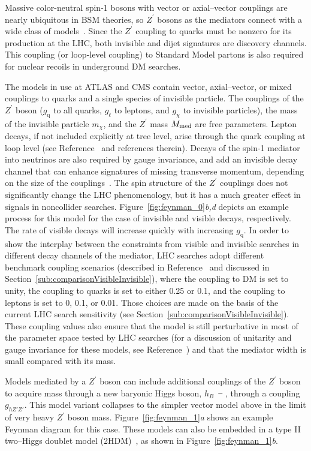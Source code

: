 \documentclass{ar-1col}
\newcommand{\chiDM}{\ensuremath{\chi}\xspace}
\newcommand{\IP}{invisible particle}
\newcommand{\mMed}{\ensuremath{M_{\rm{med}}}\xspace}
\newcommand{\mmed}{\mMed}
\newcommand{\gDM}{\ensuremath{g_{\chiDM}}\xspace}
\newcommand{\gl}{$g_{\ell}$\xspace}
\newcommand{\gq}{$g_{\mathrm{q}}$\xspace}
\newcommand{\mdm}{\ensuremath{m_{\chiDM}}\xspace}
\newcommand{\ghZprimeZprime}{\ensuremath{g_{hZ'Z'}}\xspace}
\newcommand{\Zprime}{\ensuremath{{Z}^\prime}\xspace}
\providecommand{\DIFadd}[1]{{\protect\color{blue}\uwave{#1}}} %
\providecommand{\DIFdel}[1]{{\protect\color{red}\sout{#1}}}                      %
\providecommand{\DIFaddbegin}{} %
\providecommand{\DIFaddend}{} %
\providecommand{\DIFdelbegin}{} %
\providecommand{\DIFdelend}{} %
\begin{document}
{{Massive color-neutral spin-1 bosons with vector or
axial--vector couplings} are nearly ubiquitous in BSM theories, so
\Zprime bosons as the mediators connect with a wide class of
models~\cite{Shoemaker:2011vi}. Since the \Zprime coupling to
quarks must be nonzero for its production at the LHC, both
invisible and dijet signatures are discovery channels. This
coupling (or loop-level coupling) to Standard Model partons is also required
for nuclear recoils in underground DM searches.

The models in use at ATLAS and CMS contain vector,
axial--vector, or mixed couplings to quarks and a single species of
{\IP}. The couplings of the \Zprime boson (\gq to all quarks, \gl to
leptons, and \gDM to {\IP}s), the mass of the invisible particle \mdm, and the
\Zprime mass \mmed are free parameters. Lepton decays, if not
included explicitly at tree level, arise through the quark
coupling at loop level (see Reference~ and
references therein). Decays of the spin-1 mediator into neutrinos
are also required by gauge invariance, and add an invisible decay
channel that can enhance signatures of missing transverse
momentum, depending on the size of the
couplings~\cite{Albert:2017onk}. The spin structure of the \Zprime
couplings does not significantly change the LHC phenomenology, but it
has a much greater effect in signals in noncollider searches.
Figure~\ref{fig:feynman_0}\textit{b,d} depicts an example process for this model for the case of invisible and visible decays, respectively. 
The rate of visible decays will increase quickly with increasing \gq.
In order to show the interplay between the constraints from visible
and invisible searches in different decay channels of the mediator,
LHC searches adopt different benchmark coupling scenarios
(described in Reference~ and discussed in Section~\ref{sub:comparisonVisibleInvisible}),
where the coupling to DM is set to unity, the coupling to quarks is set to either 0.25 or 0.1, 
and the coupling to leptons is set to 0, 0.1, or 0.01. 
Those choices are made on the basis of the current LHC search sensitivity
(see Section~\ref{sub:comparisonVisibleInvisible}). These coupling values also 
ensure that the model is still perturbative in most of the parameter space
tested by LHC searches (for a discussion of unitarity and gauge invariance for these models, see Reference~) and that the mediator width is small compared with its mass. 

Models mediated by a \Zprime boson can include additional couplings of the
\Zprime boson to acquire mass through a new baryonic Higgs boson,
$h_B$~\DIFdelbegin \DIFdel{\mbox{%
\cite{Berlin:2014cfa}}%
}\DIFdelend \DIFaddbegin \DIFadd{\mbox{%
\cite{Carpenter:2013xra}}%
}\DIFaddend , through a coupling \ghZprimeZprime. 
This model variant collapses to the simpler vector model
above in the limit of very heavy \Zprime boson mass. 
Figure~\ref{fig:feynman_1}\textit{a} shows an example Feynman diagram for this case. 
These models can also be
embedded in a type II two--Higgs doublet model
(2HDM)~\cite{Berlin:2014cfa}, as shown in Figure~\ref{fig:feynman_1}\textit{b}.

}
\end{document}
